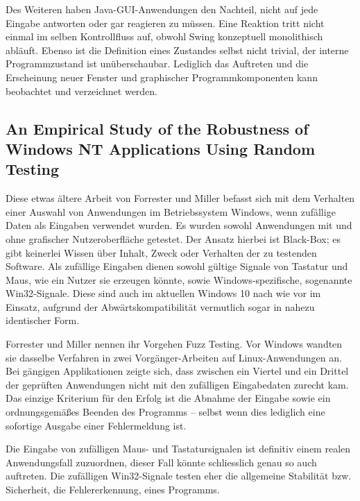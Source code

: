 Des Weiteren haben Java-GUI-Anwendungen den Nachteil, nicht auf jede Eingabe antworten oder gar
reagieren zu müssen. Eine Reaktion tritt nicht einmal im selben Kontrollfluss auf, obwohl Swing
konzeptuell monolithisch abläuft. Ebenso ist die Definition eines Zustandes selbst nicht trivial,
der interne Programmzustand ist unüberschaubar. Lediglich das Auftreten und die Erscheinung neuer
Fenster und graphischer Programmkomponenten kann beobachtet und verzeichnet werden.



\subsection{An Empirical Study of the Robustness of Windows NT Applications Using Random Testing}\label{ssection:windmueller}


Diese etwas ältere Arbeit von Forrester und Miller \cite{winNTforrester} befasst sich 
mit dem Verhalten einer Auswahl von Anwendungen im Betriebssystem Windows, wenn zufällige 
Daten als Eingaben verwendet wurden.
Es wurden sowohl Anwendungen mit und ohne grafischer Nutzeroberfläche getestet. Der Ansatz hierbei
ist Black-Box; es gibt keinerlei Wissen über Inhalt, Zweck oder Verhalten der zu testenden Software.
Als zufällige Eingaben dienen sowohl gültige Signale von Tastatur und Maus, wie ein Nutzer sie erzeugen
könnte, sowie Windows-spezifische, sogenannte \glqq{}Win32\grqq{}-Signale. Diese sind auch im aktuellen Windows 10
nach wie vor im Einsatz, aufgrund der Abwärtskompatibilität vermutlich sogar in nahezu identischer Form.

Forrester und Miller nennen ihr Vorgehen \glqq{}Fuzz Testing\grqq{}. Vor Windows wandten sie dasselbe Verfahren
in zwei Vorgänger-Arbeiten auf Linux-Anwendungen an. Bei gängigen Applikationen zeigte sich, dass zwischen
ein Viertel und ein Drittel der geprüften Anwendungen nicht mit den zufälligen Eingabedaten zurecht kam.
Das einzige Kriterium für den \glqq{}Erfolg\grqq{} ist die Abnahme der Eingabe sowie ein ordnungsgemäßes Beenden
des Programms -- selbst wenn dies lediglich eine sofortige Ausgabe einer Fehlermeldung ist.

Die Eingabe von zufälligen Maus- und Tastatursignalen ist definitiv einem realen Anwendungsfall zuzuordnen,
dieser Fall könnte schliesslich genau so auch auftreten. Die zufälligen Win32-Signale testen eher die
allgemeine Stabilität bzw. Sicherheit, die Fehlererkennung, eines Programms.


